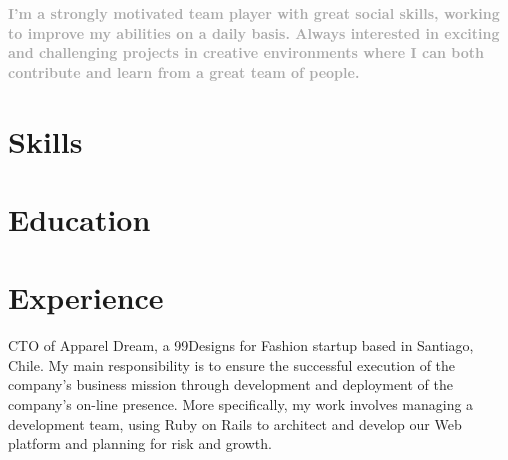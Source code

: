 \documentclass[10pt, a4paper]{moderncv}
\begin{document}
\maketitle

\begin{small}
\textcolor{darkgray}{
\textbf{I'm a strongly motivated team player with great social skills, working to improve my abilities on a daily basis. Always interested in exciting and challenging projects in creative environments where I can
both contribute and learn from a great team of people.}}
\end{small}

\section{Skills}


\section{Education}

\section{Experience}

{ 
\begin{scriptsize} 
CTO of Apparel Dream, a 99Designs for Fashion startup based in Santiago, Chile. My main responsibility is to ensure the successful execution of the company’s business mission through development and
deployment of the company’s on-line presence. More specifically, my work involves managing a development team, using Ruby on Rails to architect and develop our Web platform and planning for risk and growth.\\
\end{scriptsize}
}
\end{document}
